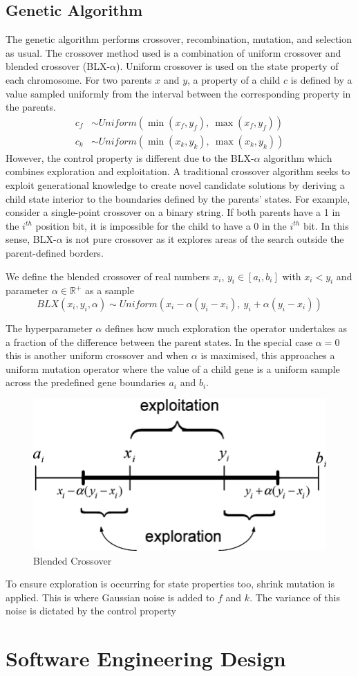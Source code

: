 
\subsection{Genetic Algorithm}
The genetic algorithm performs crossover, recombination, mutation, and selection as usual. The crossover method used is a combination of uniform crossover and blended crossover (BLX-$\alpha$). Uniform crossover is used on the state property of each chromosome. For two parents $x$ and $y$, a property of a child $c$ is defined by a value sampled uniformly from the interval between the corresponding property in the parents.
\begin{align*}
  c_f &\sim \mathit{Uniform}(\min(x_f, y_f),\ \max(x_f, y_f))\\
  c_k &\sim \mathit{Uniform}(\min(x_k, y_k),\ \max(x_k, y_k))
\end{align*}
However, the control property is different due to the BLX-$\alpha$ algorithm which combines exploration and exploitation. A traditional crossover algorithm seeks to exploit generational knowledge to create novel candidate solutions by deriving a child state interior to the boundaries defined by the parents' states. For example, consider a single-point crossover on a binary string. If both parents have a 1 in the $i^{th}$ position bit, it is impossible for the child to have a 0 in the $i^{th}$ bit. In this sense, BLX-$\alpha$ is not pure crossover as it explores areas of the search outside the parent-defined borders.

\begin{definition}
We define the blended crossover of real numbers $x_i$, $y_i \in [a_i, b_i]$ with $x_i < y_i$ and parameter $\alpha \in \mathbb{R^+}$ as a sample\\
\[
  BLX(x_i, y_i, \alpha) \sim \mathit{Uniform}(x_i - \alpha(y_i - x_i),\  y_i + \alpha(y_i - x_i))
\]
\end{definition}
The hyperparameter $\alpha$ defines how much exploration the operator undertakes as a fraction of the difference between the parent states. In the special case $\alpha = 0$ this is another uniform crossover and when $\alpha$ is maximised, this approaches a uniform mutation operator where the value of a child gene is a uniform sample across the predefined gene boundaries $a_i$ and $b_i$.\\

\begin{figure}[!h]
\centering
    \includegraphics[width=.5\textwidth]{images/blx.png}
    \caption{Blended Crossover \cite{abido2006multiobjective}}
\label{fig:blx-alpha}
\end{figure}

To ensure exploration is occurring for state properties too, shrink mutation is applied. This is where Gaussian noise is added to $f$ and $k$. The variance of this noise is dictated by the control property 


\section{Software Engineering Design}

